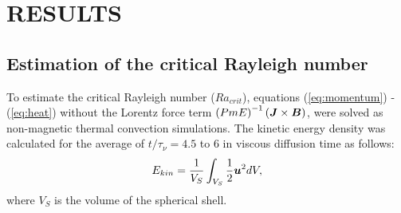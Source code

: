 \section{RESULTS}
%
\subsection{Estimation of the critical Rayleigh number}
%
To estimate the critical Rayleigh number ($Ra_{crit}$), equations (\ref{eq:momentum}) - (\ref{eq:heat}) without the Lorentz force term $\left(Pm E\right)^{-1} \left(\mbox{\boldmath$J$} \times \mbox{\boldmath$B$} \right)$, were solved as non-magnetic thermal convection simulations. The kinetic energy density was calculated for the average of $t / \tau_{\nu} = 4.5$ to 6 in viscous diffusion time as follows: 
%
\begin{equation}
E_{kin} = \frac{1}{V_{S}} \int_{V_{S}} \frac{1}{2} \mbox{\boldmath$u$}^{2} dV,
\label{eq:kinetic_energy}
\end{equation}
%
where $V_{S}$ is the volume of the spherical shell.

